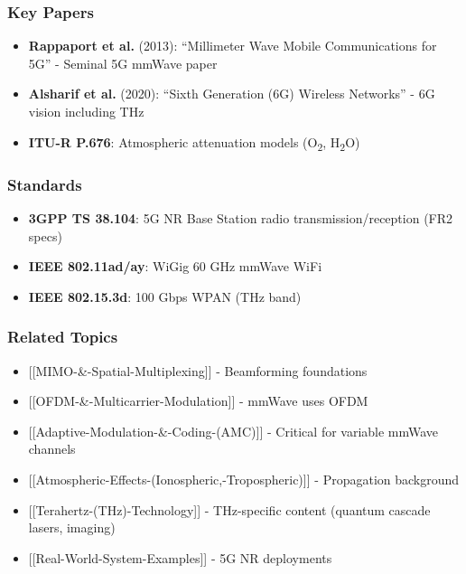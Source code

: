 \subsubsection{Key Papers}\label{key-papers}

\begin{itemize}
\tightlist
\item
  \textbf{Rappaport et al.} (2013): ``Millimeter Wave Mobile
  Communications for 5G'' - Seminal 5G mmWave paper
\item
  \textbf{Alsharif et al.} (2020): ``Sixth Generation (6G) Wireless
  Networks'' - 6G vision including THz
\item
  \textbf{ITU-R P.676}: Atmospheric attenuation models
  (O\textsubscript{2},
  H\textsubscript{2}O)
\end{itemize}

\subsubsection{Standards}\label{standards}

\begin{itemize}
\tightlist
\item
  \textbf{3GPP TS 38.104}: 5G NR Base Station radio
  transmission/reception (FR2 specs)
\item
  \textbf{IEEE 802.11ad/ay}: WiGig 60 GHz mmWave WiFi
\item
  \textbf{IEEE 802.15.3d}: 100 Gbps WPAN (THz band)
\end{itemize}

\subsubsection{Related Topics}\label{related-topics}

\begin{itemize}
\tightlist
\item
  {[}{[}MIMO-\&-Spatial-Multiplexing{]}{]} - Beamforming foundations
\item
  {[}{[}OFDM-\&-Multicarrier-Modulation{]}{]} - mmWave uses OFDM
\item
  {[}{[}Adaptive-Modulation-\&-Coding-(AMC){]}{]} - Critical for
  variable mmWave channels
\item
  {[}{[}Atmospheric-Effects-(Ionospheric,-Tropospheric){]}{]} -
  Propagation background
\item
  {[}{[}Terahertz-(THz)-Technology{]}{]} - THz-specific content (quantum
  cascade lasers, imaging)
\item
  {[}{[}Real-World-System-Examples{]}{]} - 5G NR deployments
\end{itemize}

